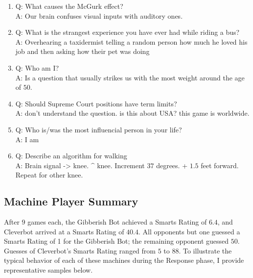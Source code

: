 \begin{enumerate}
\item Q: What causes the McGurk effect?
\\ A: Our brain confuses visual inputs with auditory ones.

\item Q: What is the strangest experience you have ever had while riding a bus?
\\ A: Overhearing a taxidermist telling a random person how much he loved his job and then asking how their pet was doing

\item Q: Who am I?
\\ A: Is a question that usually strikes us with the most weight around the age of $50$.

\item Q: Should Supreme Court positions have term limits?
\\ A: don't understand the question. is this about USA? this game is worldwide.

\item Q: Who is/was the most influencial person in your life?
\\ A: I am

\item Q: Describe an algorithm for walking
\\ A: Brain signal -> knee. $\^$ knee. Increment $37$ degrees. + $1.5$ feet forward. Repeat for other knee.
\end{enumerate}

\subsection{Machine Player Summary}

After $9$ games each, the Gibberish Bot achieved a Smarts Rating of $6.4$, and Cleverbot arrived at a Smarts Rating of $40.4$. All opponents but one guessed a Smarts Rating of 1 for the Gibberish Bot; the remaining opponent guessed $50$. Guesses of Cleverbot's Smarts Rating ranged from $5$ to $88$. To illustrate the typical behavior of each of these machines during the Response phase, I provide representative samples below.

